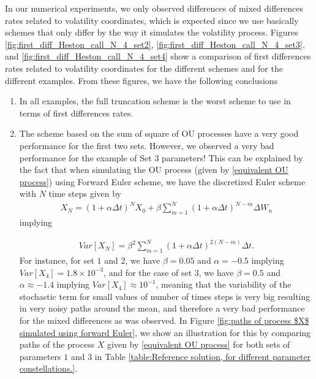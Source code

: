 In our numerical experiments, we only observed differences of mixed differences rates related to volatility coordinates, which is expected since we use basically schemes that only differ by the way it simulates the volatility process. Figures \ref{fig:first_diff_Heston_call_N_4_set2}, \ref{fig:first_diff_Heston_call_N_4_set3}, and  \ref{fig:first_diff_Heston_call_N_4_set4} show a comparison of first differences rates related to volatility coordinates for the different schemes and for the different examples. From these figures, we have the following conclusions
\begin{enumerate}
\item In all examples, the full truncation scheme is the worst scheme to use in terms of first differences rates.
\item The scheme based on the sum of square of OU processes have a very good performance for the first two sets. However, we observed a very bad performance for the example of Set $3$ parameters!  This can be explained by the fact that when simulating the OU process (given by \eqref{equivalent OU process}) using Forward Euler scheme, we have the discretized Euler scheme with $N$ time steps given by
\begin{align*}
X_N=(1+\alpha \Delta t)^N X_0+\beta \sum_{m=1}^N (1+\alpha \Delta t)^{N-m} \Delta W_n
\end{align*}
implying 

\begin{align}
Var[X_N]=\beta^2  \sum_{m=1}^N (1+\alpha \Delta t)^{2(N-m)} \Delta t.
\end{align}
For instance, for set $1$ and $2$, we have $\beta=0.05$ and $\alpha=-0.5$ implying $Var[X_4]=1.8 \times 10^{-3}$, and for the case of set $3$, we have $\beta=0.5$ and $\alpha\approx-1.4$ implying $Var[X_4]\approx   10^{-1}$, meaning that the variability of the stochastic term for small values of number of times steps is very big resulting in very noisy paths around the mean, and therefore a very bad performance for the mixed differences as was observed.  In Figure \ref{fig:paths of process $X$ simulated using forward Euler}, we show an illustration for this by comparing paths of the process $X$ given by \eqref{equivalent OU process} for both sets of parameters $1$ and $3$ in Table \ref{table:Reference solution, for different parameter constellations.}. 


\end{enumerate}
